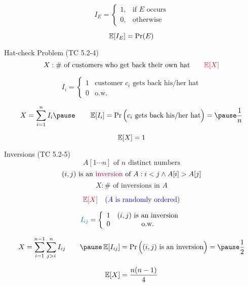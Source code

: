 
\begin{frame}{}
  \begin{definition}
    \[
      I_{E} = \begin{cases}
        1, & \text{if $E$ occurs} \\
        0, & \text{otherwise}
      \end{cases}
    \]
  \end{definition}

  \[
    \operatorname*{\mathbb{E}}[I_{E}] = \Pr(E)
  \]
\end{frame}

\begin{frame}{}
  \begin{exampleblock}{Hat-check Problem (TC 5.2-4)}
    \[
      X: \# \text{ of customers who get back their own hat} \qquad \textcolor{red}{\operatorname*{\mathbb{E}}[X]}
    \]
  \end{exampleblock}

  \pause
  \[
    I_i = \left\{\begin{array}{lc}
      1 & \text{customer } c_i \text{ gets back his/her hat} \\
      0 & \text{o.w.}
    \end{array}\right.
  \]

  \pause
  \[
    X = \sum_{i=1}^{n} I_i \pause \qquad 
    \E[I_i] = \Pr\Big( c_i \text{ gets back his/her hat} \Big) = \pause \frac{1}{n}
  \]

  \pause
  \vspace{-0.50cm}
  \[
    \operatorname*{\mathbb{E}}[X] = 1
  \]
\end{frame}

\begin{frame}{}
  \begin{exampleblock}{Inversions (TC 5.2-5)}
    \[
      A[1 \cdots n] \text{ of } n \text{ distinct numbers}
    \]
    \[
      (i,j) \text{ is an \textcolor{purple}{inversion} of } A : i < j \land A[i] > A[j]
    \]
    \[
      X: \# \text{ of inversions in } A
    \]

    \pause
    \[
      \textcolor{red}{\operatorname*{\mathbb{E}}[X]} \quad \textcolor{blue}{(A \text{ is randomly ordered})}
    \]
  \end{exampleblock}

  \pause
  \[
    \textcolor{teal}{I_{ij}} = \left\{\begin{array}{lc}
      1 & (i, j) \text{ is an inversion} \\
      0 & \text{o.w.}
    \end{array}\right.
  \]

  \pause
  \[
    X = \sum_{i=1}^{n-1} \sum_{j>i}^{n} I_{ij} \qquad \pause \E[I_{ij}] = \Pr\Big((i,j) \text{ is an inversion}\Big) = \pause \frac{1}{2}
  \]

  \pause
  \vspace{-0.50cm}
  \[
    \operatorname*{\mathbb{E}}[X] = \frac{n(n-1)}{4}
  \]
\end{frame}

